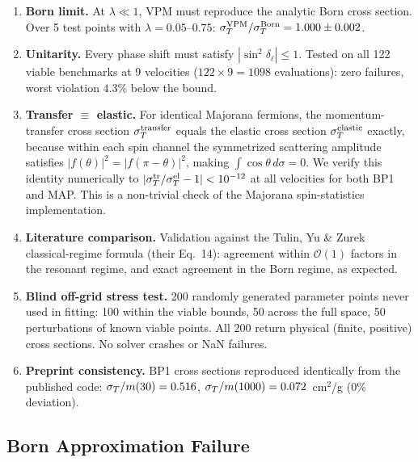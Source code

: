 \begin{enumerate}
\item \textbf{Born limit.} At $\lambda \ll 1$, VPM must reproduce the
      analytic Born cross section. Over 5 test points with $\lambda = 0.05$--$0.75$:
      $\sigma_T^{\rm VPM}/\sigma_T^{\rm Born} = 1.000 \pm 0.002$.

\item \textbf{Unitarity.} Every phase shift must satisfy
      $|\sin^2\delta_\ell| \leq 1$. Tested on all 122 viable benchmarks
      at 9 velocities ($122 \times 9 = 1098$ evaluations): zero failures,
      worst violation $4.3\%$ below the bound.

\item \textbf{Transfer $\equiv$ elastic.}
      For identical Majorana fermions, the momentum-transfer cross section
      $\sigma_T^{\rm transfer}$ equals the elastic cross section $\sigma_T^{\rm elastic}$
      exactly, because within each spin channel the symmetrized scattering
      amplitude satisfies $|f(\theta)|^2 = |f(\pi - \theta)|^2$, making
      $\int \cos\theta\, d\sigma = 0$. We verify this identity numerically to
      $|\sigma_T^{\rm tr}/\sigma_T^{\rm el} - 1| < 10^{-12}$ at all velocities
      for both BP1 and MAP. This is a non-trivial check of the Majorana
      spin-statistics implementation.

\item \textbf{Literature comparison.}
      Validation against the Tulin, Yu \& Zurek~\cite{TYZ2013} classical-regime formula
      (their Eq.~14): agreement within $\mathcal{O}(1)$ factors in the resonant regime,
      and exact agreement in the Born regime, as expected.

\item \textbf{Blind off-grid stress test.}
      200 randomly generated parameter points never used in fitting:
      100 within the viable bounds, 50 across the full space, 50 perturbations
      of known viable points. All 200 return physical (finite, positive) cross
      sections. No solver crashes or NaN failures.

\item \textbf{Preprint consistency.} BP1 cross sections reproduced identically
      from the published code: $\sigma_T/m(30) = 0.516$,
      $\sigma_T/m(1000) = 0.072$~cm$^2$/g (0\% deviation).
\end{enumerate}

\subsection{Born Approximation Failure}
\label{ch1:born}

